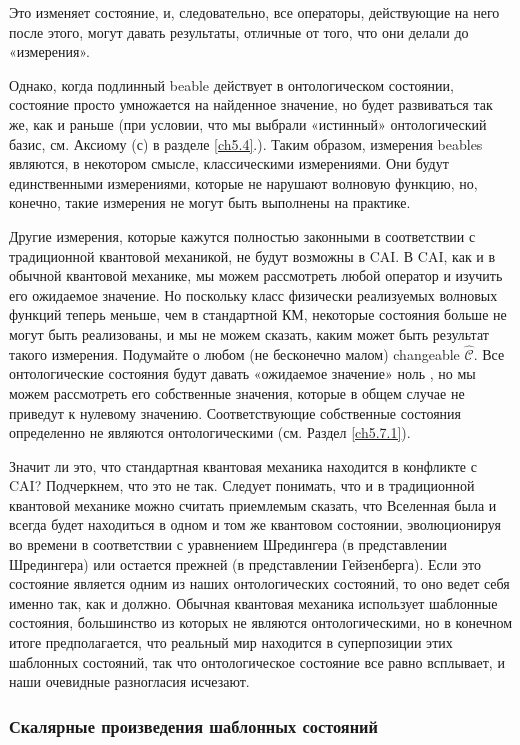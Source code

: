 \documentclass[main.tex]{subfiles}
\begin{document}
Это изменяет состояние, и, следовательно, все операторы, действующие на него после этого, могут давать результаты, отличные от того, что они делали до «измерения».

Однако, когда подлинный beable действует в онтологическом состоянии, состояние просто умножается на найденное значение, но будет развиваться так же, как и раньше (при условии, что мы выбрали «истинный» онтологический базис, см. Аксиому (с) в разделе \ref{ch5.4}.). Таким образом, измерения beables являются, в некотором смысле, классическими измерениями. Они будут единственными измерениями, которые не нарушают волновую функцию, но, конечно, такие измерения не могут быть выполнены на практике.

Другие измерения, которые кажутся полностью законными в соответствии с традиционной квантовой механикой, не будут возможны в CAI. В CAI, как и в обычной квантовой механике, мы можем рассмотреть любой оператор и изучить его ожидаемое значение. Но поскольку класс физически реализуемых волновых функций теперь меньше, чем в стандартной КМ, некоторые состояния больше не могут быть реализованы, и мы не можем сказать, каким может быть результат такого измерения. Подумайте о любом (не бесконечно малом) changeable $\hat{\mathcal{C}}$. Все онтологические состояния будут давать «ожидаемое значение» ноль , но мы можем рассмотреть его собственные значения, которые в общем случае не приведут к нулевому значению. Соответствующие собственные состояния определенно не являются онтологическими (см. Раздел \ref{ch5.7.1}).

Значит ли это, что стандартная квантовая механика находится в конфликте с CAI? Подчеркнем, что это не так. Следует понимать, что и в традиционной квантовой механике можно считать приемлемым сказать, что Вселенная была и всегда будет находиться в одном и том же квантовом состоянии, эволюционируя во времени в соответствии с уравнением Шредингера (в представлении Шредингера) или остается прежней (в представлении Гейзенберга). Если это состояние является одним из наших онтологических состояний, то оно ведет себя именно так, как и должно. Обычная квантовая механика использует шаблонные состояния, большинство из которых не являются онтологическими, но в конечном итоге предполагается, что реальный мир находится в суперпозиции этих шаблонных состояний, так что онтологическое состояние все равно всплывает, и наши очевидные разногласия исчезают.

\subsubsection{Скалярные произведения шаблонных состояний}\label{ch5.5.3}
\end{document}
